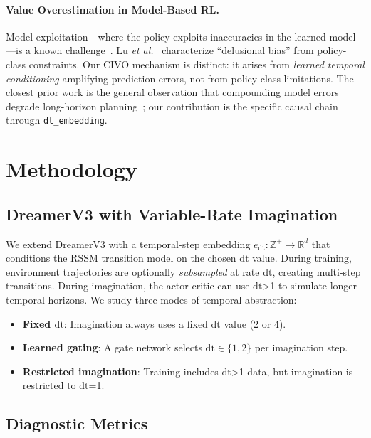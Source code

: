 \documentclass{article}
\newcommand{\dt}{\mathrm{dt}}
\newcommand{\etal}{\textit{et al.}}
\begin{document}
\paragraph{Value Overestimation in Model-Based RL.}
Model exploitation---where the policy exploits inaccuracies in the learned model---is a known challenge~\cite{janner2019mbpo}.
Lu \etal~\cite{lu2018delusional} characterize ``delusional bias'' from policy-class constraints.
Our CIVO mechanism is distinct: it arises from \emph{learned temporal conditioning} amplifying prediction errors, not from policy-class limitations.
The closest prior work is the general observation that compounding model errors degrade long-horizon planning~\cite{venkatraman2015improving}; our contribution is the specific causal chain through \texttt{dt\_embedding}.

\section{Methodology}

\subsection{DreamerV3 with Variable-Rate Imagination}

We extend DreamerV3 with a temporal-step embedding $e_{\dt}: \mathbb{Z}^+ \to \mathbb{R}^d$ that conditions the RSSM transition model on the chosen $\dt$ value.
During training, environment trajectories are optionally \emph{subsampled} at rate $\dt$, creating multi-step transitions.
During imagination, the actor-critic can use $\dt$>1 to simulate longer temporal horizons.
We study three modes of temporal abstraction:
\begin{itemize}[leftmargin=*,itemsep=1pt]
\item \textbf{Fixed $\dt$}: Imagination always uses a fixed $\dt$ value (2 or 4).
\item \textbf{Learned gating}: A gate network selects $\dt \in \{1,2\}$ per imagination step.
\item \textbf{Restricted imagination}: Training includes $\dt$>1 data, but imagination is restricted to $\dt$=1.
\end{itemize}

\subsection{Diagnostic Metrics}
\end{document}
